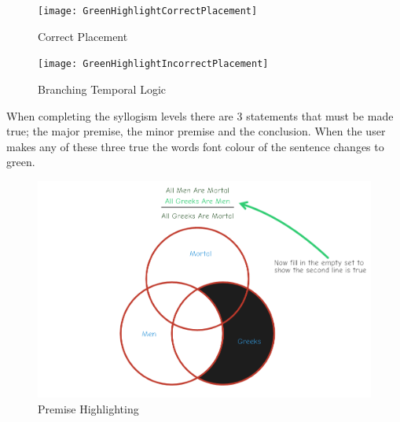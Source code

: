 \documentclass[12pt,a4paper]{report}
\begin{document}
\begin{figure}[!h]
  \centering
  \begin{minipage}[b]{0.4\textwidth}
    \texttt{[image: GreenHighlightCorrectPlacement]}
    \caption{Correct Placement}
  \end{minipage}
  \hfill
  \begin{minipage}[b]{0.4\textwidth}
    \texttt{[image: GreenHighlightIncorrectPlacement]}
    \caption{Branching Temporal Logic}
  \end{minipage}
\end{figure}
\FloatBarrier

When completing the syllogism levels there are 3 statements that must be made true; the major premise, the minor premise and the conclusion. When the user makes any of these three true the words font colour of the sentence changes to green.


\begin{figure}[h]
\centering
    \includegraphics[scale=0.5]{PremiseHighlight}
    \caption{Premise Highlighting}
    \label{fig:floodFillBad}
\end{figure}
\FloatBarrier



 
\end{document}
